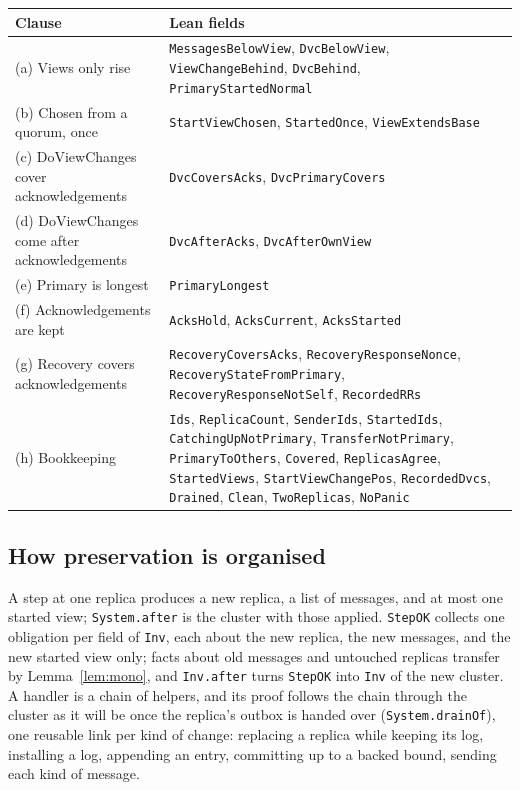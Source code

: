\documentclass[11pt,a4paper]{article}
\theoremstyle{plain}
\theoremstyle{definition}
\theoremstyle{remark}
\begin{document}
\begin{center}
\small
\begin{tabular}{@{}p{4.6cm}p{9.6cm}@{}}
\toprule
Clause & Lean fields \\
\midrule
(a) Views only rise & \texttt{MessagesBelowView}, \texttt{DvcBelowView}, \texttt{ViewChangeBehind}, \texttt{DvcBehind}, \texttt{PrimaryStartedNormal} \\
(b) Chosen from a quorum, once & \texttt{StartViewChosen}, \texttt{StartedOnce}, \texttt{ViewExtendsBase} \\
(c) DoViewChanges cover acknowledgements & \texttt{DvcCoversAcks}, \texttt{DvcPrimaryCovers} \\
(d) DoViewChanges come after acknowledgements & \texttt{DvcAfterAcks}, \texttt{DvcAfterOwnView} \\
(e) Primary is longest & \texttt{PrimaryLongest} \\
(f) Acknowledgements are kept & \texttt{AcksHold}, \texttt{AcksCurrent}, \texttt{AcksStarted} \\
(g) Recovery covers acknowledgements & \texttt{RecoveryCoversAcks}, \texttt{RecoveryResponseNonce}, \texttt{RecoveryStateFromPrimary}, \texttt{RecoveryResponseNotSelf}, \texttt{RecordedRRs} \\
(h) Bookkeeping & \texttt{Ids}, \texttt{ReplicaCount}, \texttt{SenderIds}, \texttt{StartedIds}, \texttt{CatchingUpNotPrimary}, \texttt{TransferNotPrimary}, \texttt{PrimaryToOthers}, \texttt{Covered}, \texttt{ReplicasAgree}, \texttt{StartedViews}, \texttt{StartViewChangePos}, \texttt{RecordedDvcs}, \texttt{Drained}, \texttt{Clean}, \texttt{TwoReplicas}, \texttt{NoPanic} \\
\bottomrule
\end{tabular}
\end{center}

\subsection{How preservation is organised}

A step at one replica produces a new replica, a list of messages, and at
most one started view; \texttt{System.after} is the cluster with those
applied. \texttt{StepOK} collects one obligation per field of
\texttt{Inv}, each about the new replica, the new messages, and the new
started view only; facts about old messages and untouched replicas
transfer by Lemma~\ref{lem:mono}, and \texttt{Inv.after} turns
\texttt{StepOK} into \texttt{Inv} of the new cluster. A handler is a
chain of helpers, and its proof follows the chain through the cluster as
it will be once the replica's outbox is handed over
(\texttt{System.drainOf}), one reusable link per kind of change:
replacing a replica while keeping its log, installing a log, appending an
entry, committing up to a backed bound, sending each kind of message.
\end{document}
